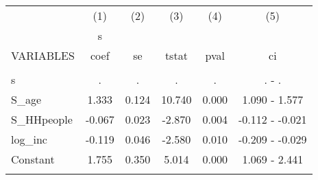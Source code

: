 \begin{tabular}{lccccc} \hline
 & (1) & (2) & (3) & (4) & (5) \\
 & s &  &  &  &  \\
VARIABLES & coef & se & tstat & pval & ci \\ \hline
 &  &  &  &  &  \\
s & . & . & . & . & . - . \\
S\_age & 1.333 & 0.124 & 10.740 & 0.000 & 1.090 - 1.577 \\
S\_HHpeople & -0.067 & 0.023 & -2.870 & 0.004 & -0.112 - -0.021 \\
log\_inc & -0.119 & 0.046 & -2.580 & 0.010 & -0.209 - -0.029 \\
Constant & 1.755 & 0.350 & 5.014 & 0.000 & 1.069 - 2.441 \\
 &  &  &  &  &  \\ \hline
\end{tabular}
